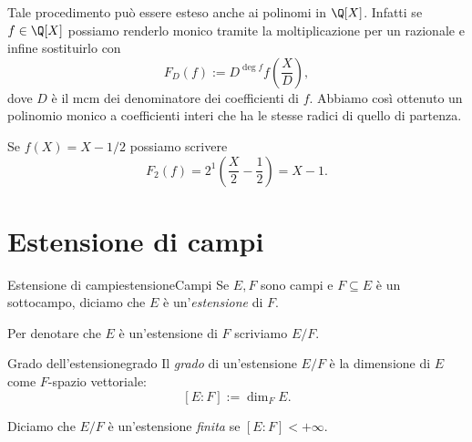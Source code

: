 \begin{oss}
	Tale procedimento può essere esteso anche ai polinomi in \(\Q[X]\). Infatti se \(f\in \Q[X]\) possiamo renderlo monico tramite la moltiplicazione per un razionale e infine sostituirlo con
	\[
		F_D(f):= D^{\deg f} f \left( \frac{X}{D} \right),
	\]
	dove \(D\) è il mcm dei denominatore dei coefficienti di \(f\). Abbiamo così ottenuto un polinomio monico a coefficienti interi che ha le stesse radici di quello di partenza.
\end{oss}

\begin{ese}
	Se \(f(X) = X-1/2\) possiamo scrivere
	\[
		F_2(f) = 2^1 \left( \frac{X}{2}-\frac{1}{2} \right) = X-1.
	\]
\end{ese}
%
%
\section{Estensione di campi}

\begin{defn}{Estensione di campi}{estensioneCampi}
	Se \(E,F\) sono campi e \(F\subseteq E\) è un sottocampo, diciamo che \(E\) è un'\emph{estensione} di \(F\).
\end{defn}

\begin{notz}
	Per denotare che \(E\) è un'estensione di \(F\) scriviamo \(E/F\).
\end{notz}

\begin{defn}{Grado dell'estensione}{grado}
	Il \emph{grado} di un'estensione \(E/F\) è la dimensione di \(E\) come \(F\)-spazio vettoriale:
	\[
		[E:F] := \dim_F E.
	\]
\end{defn}

\begin{notz}
	Diciamo che \(E/F\) è un'estensione \emph{finita} se \([E:F]<+\infty\).
\end{notz}

